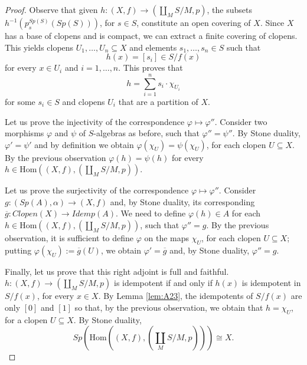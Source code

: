 \begin{theorem}
\begin{proof}
        Observe that given $h:(X,f)\longrightarrow (\coprod_MS/M,p)$, the subsets $h^{-1}(p_s^{Sp(S)}(Sp(S)))$, for $s\in S$, constitute an open covering of $X$. Since $X$ has a base of clopens and is compact, we can extract a finite covering of clopens. This yields clopens $U_1,\dots, U_n\subseteq X$ and elements $s_1,\dots, s_n\in S$ such that
        \[ h(x) = [s_i]\in S/f(x) \]
        for every $x\in U_i$ and $i=1,\dots, n$. This proves that
        \[ h=\sum_{i=1}^ns_i\cdot \chi_{U_i} \]
        for some $s_i\in S$ and clopens $U_i$ that are a partition of $X$.

        Let us prove the injectivity of the correspondence $\varphi\longmapsto \varphi''$. Consider two morphisms $\varphi$ and $\psi$ of $S$-algebras as before, such that $\varphi''=\psi''$. By Stone duality, $\varphi'=\psi'$ and by definition we obtain $\varphi(\chi_U)=\psi(\chi_U)$, for each clopen $U\subseteq X$. By the previous observation $\varphi(h)=\psi(h)$ for every $h\in\text{Hom}((X,f),(\coprod_MS/M,p))$.

        Let us prove the surjectivity of the correspondence $\varphi\longmapsto \varphi''$. Consider $g:(Sp(A),\alpha)\longrightarrow (X,f)$ and, by Stone duality, its corresponding $\overline{g}:Clopen(X)\to Idemp(A)$. We need to define $\varphi(h)\in A$ for each $h\in \text{Hom}((X,f),(\coprod_MS/M,p))$, such that $\varphi''=g$. By the previous observation, it is sufficient to define $\varphi$ on the maps $\chi_U$, for each clopen $U\subseteq X$; putting $\varphi(\chi_U) := \overline{g}(U)$, we obtain $\varphi'=\overline{g}$ and, by Stone duality, $\varphi''=g$.
        
        Finally, let us prove that this right adjoint is full and faithful. $h:(X,f)\longrightarrow (\coprod_MS/M,p)$ is idempotent if and only if $h(x)$ is idempotent in $S/f(x)$, for every $x\in X$. By Lemma \ref{lem:A23}, the idempotents of $S/f(x)$ are only $[0]$ and $[1]$ so that, by the previous observation, we obtain that $h=\chi_U$, for a clopen $U\subseteq X$. By Stone duality,
        \[ Sp(\text{Hom}((X,f),(\coprod_M S/M, p))) \cong X. \]
    \end{proof}
\end{theorem}
